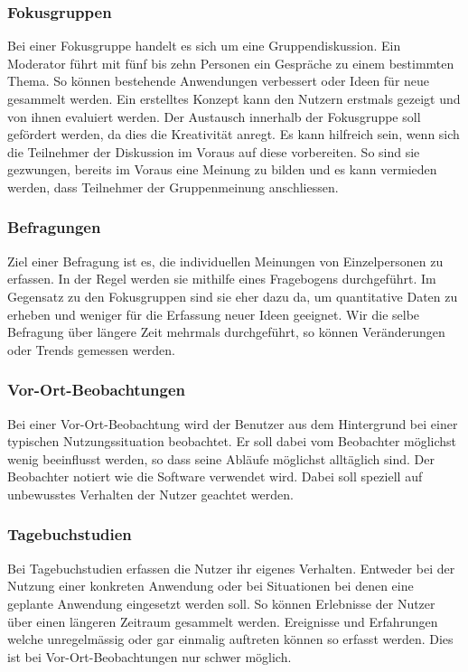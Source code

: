 \subsubsection{Fokusgruppen}\label{fokusgruppe}
Bei einer Fokusgruppe handelt es sich um eine Gruppendiskussion.
Ein Moderator führt mit fünf bis zehn Personen ein Gespräche zu einem bestimmten Thema.
So können bestehende Anwendungen verbessert oder Ideen für neue gesammelt werden.
Ein erstelltes Konzept kann den Nutzern erstmals gezeigt und von ihnen evaluiert werden.
Der Austausch innerhalb der Fokusgruppe soll gefördert werden, da dies die Kreativität anregt.
Es kann hilfreich sein, wenn sich die Teilnehmer der Diskussion im Voraus auf diese vorbereiten.
So sind sie gezwungen, bereits im Voraus eine Meinung zu bilden und es kann vermieden werden, dass Teilnehmer der Gruppenmeinung anschliessen.


\subsubsection{Befragungen}\label{befragung}
Ziel einer Befragung ist es, die individuellen Meinungen von Einzelpersonen zu erfassen.
In der Regel werden sie mithilfe eines Fragebogens durchgeführt.
Im Gegensatz zu den Fokusgruppen sind sie eher dazu da, um quantitative Daten zu erheben und weniger für die Erfassung neuer Ideen geeignet.
Wir die selbe Befragung über längere Zeit mehrmals durchgeführt, so können Veränderungen oder Trends gemessen werden.


\subsubsection{Vor-Ort-Beobachtungen}\label{vorort}
Bei einer Vor-Ort-Beobachtung wird der Benutzer aus dem Hintergrund bei einer typischen Nutzungssituation beobachtet.
Er soll dabei vom Beobachter möglichst wenig beeinflusst werden, so dass seine Abläufe möglichst alltäglich sind.
Der Beobachter notiert wie die Software verwendet wird.
Dabei soll speziell auf unbewusstes Verhalten der Nutzer geachtet werden.


\subsubsection{Tagebuchstudien}\label{tagebuchstudien}
Bei Tagebuchstudien erfassen die Nutzer ihr eigenes Verhalten.
Entweder bei der Nutzung einer konkreten Anwendung oder bei Situationen bei denen eine geplante Anwendung eingesetzt werden soll.
So können Erlebnisse der Nutzer über einen längeren Zeitraum gesammelt werden.
Ereignisse und Erfahrungen welche unregelmässig oder gar einmalig auftreten können so erfasst werden.
Dies ist bei Vor-Ort-Beobachtungen nur schwer möglich.
